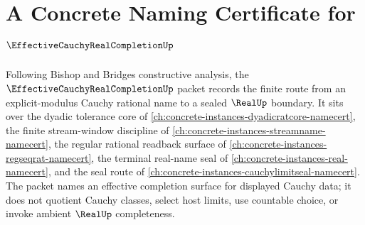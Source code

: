 \chapter{A Concrete Naming Certificate for $\EffectiveCauchyRealCompletionUp$}
\label{ch:concrete-instances-effective-cauchy-real-completion-namecert}

Following Bishop and Bridges constructive analysis, the $\EffectiveCauchyRealCompletionUp$ packet records the finite route from an explicit-modulus Cauchy rational name to a sealed $\RealUp$ boundary. It sits over the dyadic tolerance core of \autoref{ch:concrete-instances-dyadicratcore-namecert}, the finite stream-window discipline of \autoref{ch:concrete-instances-streamname-namecert}, the regular rational readback surface of \autoref{ch:concrete-instances-regseqrat-namecert}, the terminal real-name seal of \autoref{ch:concrete-instances-real-namecert}, and the seal route of \autoref{ch:concrete-instances-cauchylimitseal-namecert}. The packet names an effective completion surface for displayed Cauchy data; it does not quotient Cauchy classes, select host limits, use countable choice, or invoke ambient $\RealUp$ completeness.

